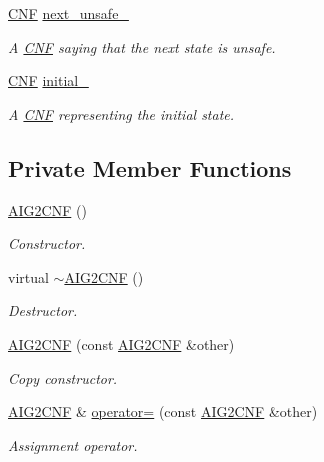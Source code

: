 \begin{DoxyCompactItemize}
\hyperlink{classCNF}{C\-N\-F} \hyperlink{classAIG2CNF_a0430b9b4ff38a7b0ae339fb0abd191c9}{next\-\_\-unsafe\-\_\-}
\begin{DoxyCompactList}\small\item\em A \hyperlink{classCNF}{C\-N\-F} saying that the next state is unsafe. \end{DoxyCompactList}\item 
\hyperlink{classCNF}{C\-N\-F} \hyperlink{classAIG2CNF_a83d0b27b61d672ecf2bd007e0d473439}{initial\-\_\-}
\begin{DoxyCompactList}\small\item\em A \hyperlink{classCNF}{C\-N\-F} representing the initial state. \end{DoxyCompactList}\end{DoxyCompactItemize}
\subsection*{Private Member Functions}
\begin{DoxyCompactItemize}
\item 
\hyperlink{classAIG2CNF_a2da966a41a8ff74e6ecebf0d1d3d3829}{A\-I\-G2\-C\-N\-F} ()
\begin{DoxyCompactList}\small\item\em Constructor. \end{DoxyCompactList}\item 
virtual \hyperlink{classAIG2CNF_ab97283bcce3d32f458ed7717b452e931}{$\sim$\-A\-I\-G2\-C\-N\-F} ()
\begin{DoxyCompactList}\small\item\em Destructor. \end{DoxyCompactList}\item 
\hyperlink{classAIG2CNF_a2b3b1fac1ae78ff3c9dac99cd7b63d9d}{A\-I\-G2\-C\-N\-F} (const \hyperlink{classAIG2CNF}{A\-I\-G2\-C\-N\-F} \&other)
\begin{DoxyCompactList}\small\item\em Copy constructor. \end{DoxyCompactList}\item 
\hyperlink{classAIG2CNF}{A\-I\-G2\-C\-N\-F} \& \hyperlink{classAIG2CNF_a1ee82fcfe444616f35078957ec762489}{operator=} (const \hyperlink{classAIG2CNF}{A\-I\-G2\-C\-N\-F} \&other)
\begin{DoxyCompactList}\small\item\em Assignment operator. \end{DoxyCompactList}\end{DoxyCompactItemize}
